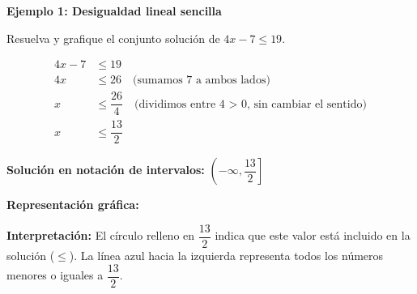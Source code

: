 \begin{example}
\textbf{Ejemplo 1: Desigualdad lineal sencilla}

Resuelva y grafique el conjunto solución de $4x - 7 \le 19$.

\solution
\begin{align*}
4x - 7 &\le 19 \\
4x &\le 26 \quad \text{(sumamos 7 a ambos lados)} \\
x &\le \dfrac{26}{4} \quad \text{(dividimos entre 4 > 0, sin cambiar el sentido)} \\
x &\le \dfrac{13}{2}
\end{align*}

\textbf{Solución en notación de intervalos:} $\left(-\infty, \dfrac{13}{2}\right]$

\textbf{Representación gráfica:}

\begin{center}
\end{center}

\textbf{Interpretación:} El círculo relleno en $\dfrac{13}{2}$ indica que este valor está incluido en la solución ($\le$). La línea azul hacia la izquierda representa todos los números menores o iguales a $\dfrac{13}{2}$.
\end{example}


